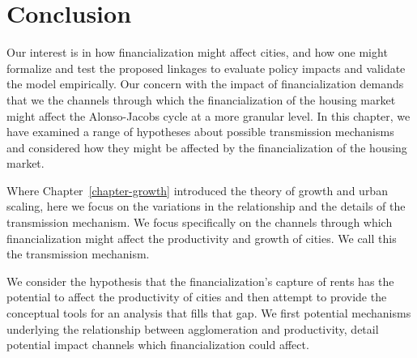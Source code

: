 \section{Conclusion}
Our interest is in how financialization might affect cities, and how one might formalize and test the proposed linkages to evaluate policy impacts and validate the model empirically.
Our concern with the impact of financialization demands that we the channels through which the financialization of the housing market might affect the Alonso-Jacobs cycle at a more granular level.
In this chapter, we have examined a range of hypotheses about possible transmission mechanisms and considered how they might be affected by the financialization of the housing market.

Where Chapter~\ref{chapter-growth} introduced the theory of growth and urban scaling, here we focus on the variations in the relationship and the details of the transmission mechanism. We focus specifically on the channels through which financialization might affect the productivity and growth of cities. We call this the \gls{transmission mechanism}.
 
We consider the hypothesis that the financialization's capture of rents has the potential to affect the productivity of cities and then attempt to provide the conceptual tools for an analysis that fills that gap. We first potential mechanisms underlying the relationship between agglomeration and productivity, detail potential impact channels which financialization could affect. 




